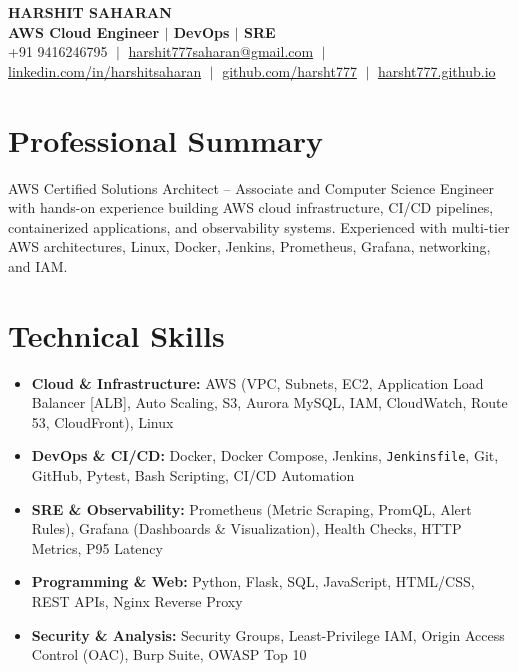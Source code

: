 \documentclass[letterpaper,9.8pt]{article}
\newcommand{\resumeSkillListStart}{\begin{itemize}[leftmargin=0.18in, labelsep=0.06in, itemsep=1.2pt, topsep=0.5pt, parsep=0pt, partopsep=0pt]}
\newcommand{\resumeSkillListEnd}{\end{itemize}\vspace{1.5pt}}
\begin{document}
\begin{center}
    {\Huge \textbf{HARSHIT SAHARAN}} \\ \vspace{2pt}
    {\large \textbf{\color{primary}AWS Cloud Engineer $\vert$ DevOps $\vert$ SRE}} \\ \vspace{3.5pt}
    \small 
    +91 9416246795 $\;\vert\;$ 
    \href{mailto:harshit777saharan@gmail.com}{harshit777saharan@gmail.com} $\;\vert\;$ 
    \href{https://linkedin.com/in/harshitsaharan}{linkedin.com/in/harshitsaharan} $\;\vert\;$ 
    \href{https://github.com/harsht777}{github.com/harsht777} $\;\vert\;$ 
    \href{https://harsht777.github.io/}{harsht777.github.io}
\end{center}
\vspace{-10pt}

\section{Professional Summary}
\vspace{1pt}
\small{
AWS Certified Solutions Architect -- Associate and Computer Science Engineer with hands-on experience building AWS cloud infrastructure, CI/CD pipelines, containerized applications, and observability systems. Experienced with multi-tier AWS architectures, Linux, Docker, Jenkins, Prometheus, Grafana, networking, and IAM.
}
\vspace{2pt}

\section{Technical Skills}
\resumeSkillListStart
  \item \small{\textbf{Cloud \& Infrastructure:} AWS (VPC, Subnets, EC2, Application Load Balancer [ALB], Auto Scaling, S3, Aurora MySQL, IAM, CloudWatch, Route 53, CloudFront), Linux}
  \item \small{\textbf{DevOps \& CI/CD:} Docker, Docker Compose, Jenkins, \texttt{Jenkinsfile}, Git, GitHub, Pytest, Bash Scripting, CI/CD Automation}
  \item \small{\textbf{SRE \& Observability:} Prometheus (Metric Scraping, PromQL, Alert Rules), Grafana (Dashboards \& Visualization), Health Checks, HTTP Metrics, P95 Latency}
  \item \small{\textbf{Programming \& Web:} Python, Flask, SQL, JavaScript, HTML/CSS, REST APIs, Nginx Reverse Proxy}
  \item \small{\textbf{Security \& Analysis:} Security Groups, Least-Privilege IAM, Origin Access Control (OAC), Burp Suite, OWASP Top 10}
\resumeSkillListEnd
\end{document}
